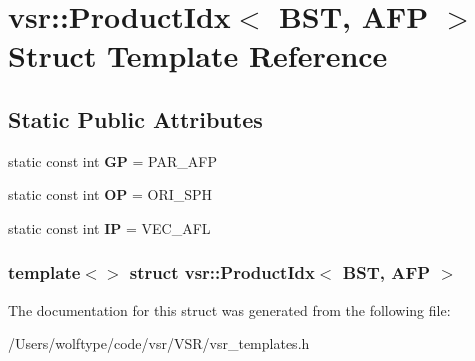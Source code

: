 \hypertarget{structvsr_1_1_product_idx_3_01_b_s_t_00_01_a_f_p_01_4}{\section{vsr\-:\-:Product\-Idx$<$ B\-S\-T, A\-F\-P $>$ Struct Template Reference}
\label{structvsr_1_1_product_idx_3_01_b_s_t_00_01_a_f_p_01_4}
}
\subsection*{Static Public Attributes}
\begin{DoxyCompactItemize}
\item 
\hypertarget{structvsr_1_1_product_idx_3_01_b_s_t_00_01_a_f_p_01_4_a1a6f5722b4792bc074cdf1579a47acbb}{static const int {\bfseries G\-P} = P\-A\-R\-\_\-\-A\-F\-P}\label{structvsr_1_1_product_idx_3_01_b_s_t_00_01_a_f_p_01_4_a1a6f5722b4792bc074cdf1579a47acbb}

\item 
\hypertarget{structvsr_1_1_product_idx_3_01_b_s_t_00_01_a_f_p_01_4_abb150e7f2a7acc5bcf75b5db533520bc}{static const int {\bfseries O\-P} = O\-R\-I\-\_\-\-S\-P\-H}\label{structvsr_1_1_product_idx_3_01_b_s_t_00_01_a_f_p_01_4_abb150e7f2a7acc5bcf75b5db533520bc}

\item 
\hypertarget{structvsr_1_1_product_idx_3_01_b_s_t_00_01_a_f_p_01_4_a8b0408b0ea92aae7deaeb9600a806337}{static const int {\bfseries I\-P} = V\-E\-C\-\_\-\-A\-F\-L}\label{structvsr_1_1_product_idx_3_01_b_s_t_00_01_a_f_p_01_4_a8b0408b0ea92aae7deaeb9600a806337}

\end{DoxyCompactItemize}
\subsubsection*{template$<$$>$ struct vsr\-::\-Product\-Idx$<$ B\-S\-T, A\-F\-P $>$}



The documentation for this struct was generated from the following file\-:\begin{DoxyCompactItemize}
\item 
/\-Users/wolftype/code/vsr/\-V\-S\-R/vsr\-\_\-templates.\-h\end{DoxyCompactItemize}
